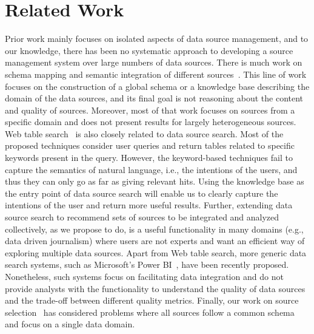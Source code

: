 \documentclass{sig-alternate}
\begin{document}
\section{Related Work}
\label{sec:related}
Prior work mainly focuses on isolated aspects of data source management, and to our knowledge, there has been no systematic approach to developing a source management system over large numbers of data sources. There is much work on schema mapping and semantic integration of different
sources~\cite{cafarella:2009,venetis:11, oktie:13}. This line of work focuses on the construction of a global schema or a knowledge base describing the domain of the data sources, and its final goal is not reasoning about the content and quality of sources. Moreover, most of that work focuses on sources from a specific domain and does not present results for largely heterogeneous sources. Web table search~\cite{cafarella:2009,limaye:2010, dassarma:2012,yakout:2012, fan:2014} is also closely related to data source search. Most of the proposed techniques consider user queries and return tables related to specific keywords present in the query. However, the keyword-based techniques fail to capture the semantics of natural language, i.e., the intentions of the users, and thus they can only go as far as giving relevant hits. Using the knowledge base as the entry point of data source search will enable us to clearly capture the intentions of the user and return more useful results. Further, extending data source search to recommend sets of sources to be integrated and analyzed collectively, as we propose to do, is a useful functionality in many domains (e.g., data driven journalism) where users are not experts and want an efficient way of exploring multiple data sources. Apart from Web table search, more generic data search systems, such as Microsoft's Power BI~\cite{powerbi}, have been recently proposed. Nonetheless, such systems focus on facilitating data integration and do not provide analysts with the functionality to understand the quality of data sources and the trade-off between different quality metrics. Finally, our work on source selection~\cite{dong:vldb13, rekatsinas:2014} has considered problems where all sources follow a common schema and focus on a single data domain.
\end{document}
